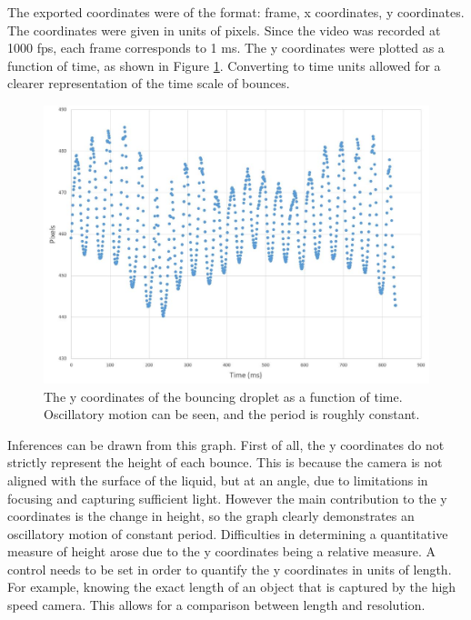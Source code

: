 The exported coordinates were of the format: frame, x coordinates, y coordinates. The coordinates were given in units of pixels. Since the video was recorded at 1000 fps, each frame corresponds to 1 ms. The y coordinates were plotted as a function of time, as shown in Figure \ref{fig:droplet_amplitude_graph}. Converting to time units allowed for a clearer representation of the time scale of bounces.

\begin{figure}[htb]
\includegraphics[width=\textwidth]{prototype/exp_rep_imgs/droplet_amplitude_graph.jpg}
\centering
\caption{The y coordinates of the bouncing droplet as a function of time. Oscillatory motion can be seen, and the period is roughly constant.}
\centering
\label{fig:droplet_amplitude_graph}
\end{figure}

Inferences can be drawn from this graph. First of all, the y coordinates do not strictly represent the height of each bounce. This is because the camera is not aligned with the surface of the liquid, but at an angle, due to limitations in focusing and capturing sufficient light. However the main contribution to the y coordinates is the change in height, so the graph clearly demonstrates an oscillatory motion of constant period. Difficulties in determining a quantitative measure of height arose due to the y coordinates being a relative measure. A control needs to be set in order to quantify the y coordinates in units of length. For example, knowing the exact length of an object that is captured by the high speed camera. This allows for a comparison between length and resolution.

